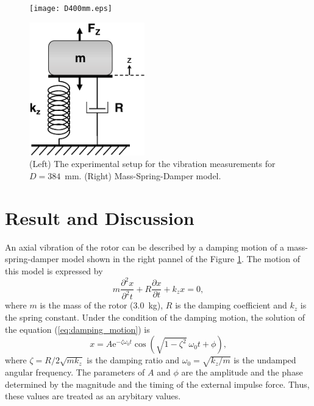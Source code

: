 \documentclass[a4paper]{jpconf}
\begin{document}
\begin{figure}[htbp]
  \centering
  \begin{minipage}{0.6\hsize}
    \texttt{[image: D400mm.eps]}
  \end{minipage}
  \begin{minipage}{0.3\hsize}
    \centering
    \includegraphics[width=50mm]{SpringSystem.eps}
  \end{minipage}
  \caption{(Left) The experimental setup for the vibration measurements for $D=384$~mm. (Right) Mass-Spring-Damper model.}
  \label{fig:d400}
\end{figure}


\section*{Result and Discussion}

An axial vibration of the rotor can be described by a damping motion of a mass-spring-damper model \cite{mds} shown in the right pannel of the Figure \ref{fig:d400}.
The motion of this model is expressed by
\begin{equation}
  m \frac{\partial^{2} x}{\partial^{2} t} + R \frac{\partial x}{\partial t} + k_{z} x = 0,
  \label{eq:damping_motion}
\end{equation}
where $m$ is the mass of the rotor (3.0~kg), $R$ is the damping coefficient and $k_{z}$ is the spring constant.
Under the condition of the damping motion, the solution of the equation (\ref{eq:damping_motion}) is
\begin{equation}
  x = A \mathrm{e}^{- \zeta \omega_{0} t} \cos( \sqrt{1 - \zeta^{2}} \ \omega_{0} t + \phi),
  \label{eq:damping}
\end{equation}
where $\zeta = R / 2 \sqrt{mk_{z}}$ is the damping ratio and $\omega_{0} = \sqrt{k_{z}/m}$ is the undamped angular frequency.
The parameters of $A$ and $\phi$ are the amplitude and the phase determined by the magnitude and the timing of the external impulse force.
Thus, these values are treated as an arybitary values.
\end{document}
